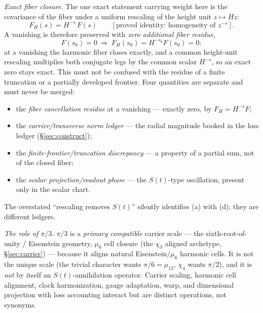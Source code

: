 \documentclass[11pt]{article}
\theoremstyle{definition}
\begin{document}
\emph{Exact fiber closure.} The one exact statement carrying weight here is the covariance of the fiber under a
uniform rescaling of the height unit $z\mapsto Hz$:
\[
  F_H(s)=H^{-s}\,F(s)\qquad[\text{proved identity: homogeneity of }z^{-s}].
\]
A vanishing is therefore preserved with \emph{zero additional fiber residue},
\[
  F(s_0)=0\ \Longrightarrow\ F_H(s_0)=H^{-s_0}F(s_0)=0 :
\]
at a vanishing the harmonic fiber closes exactly, and a common height-unit rescaling multiplies both conjugate
legs by the common scalar $H^{-s}$, so an exact zero stays exact. This must not be confused with the residue of
a finite truncation or a partially developed frontier. Four quantities are separate and must never be merged:
\begin{itemize}
\item[(a)] the \emph{fiber cancellation residue} at a vanishing --- exactly zero, by $F_H=H^{-s}F$;
\item[(b)] the \emph{carrier/transverse norm ledger} --- the radial magnitude booked in the loss ledger
(\S\ref{sec:construct});
\item[(c)] the \emph{finite-frontier/truncation discrepancy} --- a property of a partial sum, not of the
closed fiber;
\item[(d)] the \emph{scalar projection/readout phase} --- the $S(t)$-type oscillation, present only in the
scalar chart.
\end{itemize}
The overstated ``rescaling removes $S(t)$'' silently identifies (a) with (d); they are different ledgers.

\emph{The role of $\pi/3$.} $\pi/3$ is a \emph{primary compatible} carrier scale --- the
sixth-root-of-unity / Eisenstein geometry, $\mu_6$ cell closure (the $\chi_3$ aligned archetype,
\S\ref{sec:carrier}) --- because it aligns natural Eisenstein/$\mu_6$ harmonic cells. It is not the unique
scale (the trivial character wants $\pi/6=\mu_{12}$, $\chi_4$ wants $\pi/2$), and it is \emph{not} by itself an
$S(t)$-annihilation operator. Carrier scaling, harmonic cell alignment, clock harmonization, gauge adaptation,
warp, and dimensional projection with loss accounting interact but are distinct operations, not synonyms.
\end{document}
